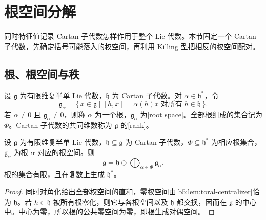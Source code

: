 
\section{根空间分解}
\label{b5:sec:1602}

同时特征值记录 Cartan 子代数怎样作用于整个 Lie 代数。本节固定一个 Cartan 子代数，先确定括号可能落入的权空间，再利用 Killing 型把相反的权空间配对。


%
%

\subsection{根、根空间与秩}
\label{b5:subsec:1602:01}

\begin{definition}\label{b5:def:lie-roots}
	设 \(\mathfrak g\) 为有限维复半单 Lie 代数，\(\mathfrak h\) 为 Cartan 子代数。对 \(\alpha\in\mathfrak h^*\)，令
	\[
		\mathfrak g_\alpha =\bigl\{\,x\in\mathfrak g\mid[h,x]=\alpha(h)x \;\text{对所有}\;h\in\mathfrak h\,\bigr\}.
	\]
	若 \(\alpha\ne0\) 且 \(\mathfrak g_\alpha\ne0\)，则称 \(\alpha\) 为一个根，\(\mathfrak g_\alpha\) 为[root space]。全部根组成的集合记为 \(\Phi\)。Cartan 子代数的共同维数称为 \(\mathfrak g\) 的[rank]。
\end{definition}

\begin{theorem}[根空间分解]\label{b5:thm:root-decomposition}
	设 \(\mathfrak g\) 为有限维复半单 Lie 代数，\(\mathfrak h\subseteq\mathfrak g\) 为 Cartan 子代数，\(\Phi\subseteq\mathfrak h^*\) 为相应根集合，\(\mathfrak g_\alpha\) 为根 \(\alpha\) 对应的根空间。则
	\begin{equation}\label{b5:eq:root-decomposition}
		\mathfrak g=\mathfrak h\oplus\bigoplus_{\alpha\in\Phi}\mathfrak g_\alpha.
	\end{equation}
	根的集合有限，且在复数上生成 \(\mathfrak h^*\)。
\end{theorem}
\begin{proof}
	同时对角化给出全部权空间的直和，零权空间由\cref{b5:lem:toral-centralizer}恰为 \(\mathfrak h\)。若 \(h\in\mathfrak h\) 被所有根零化，则它与各根空间以及 \(\mathfrak h\) 都交换，因而在 \(\mathfrak g\) 的中心中。中心为零，所以根的公共零空间为零，即根生成对偶空间。
\end{proof}

